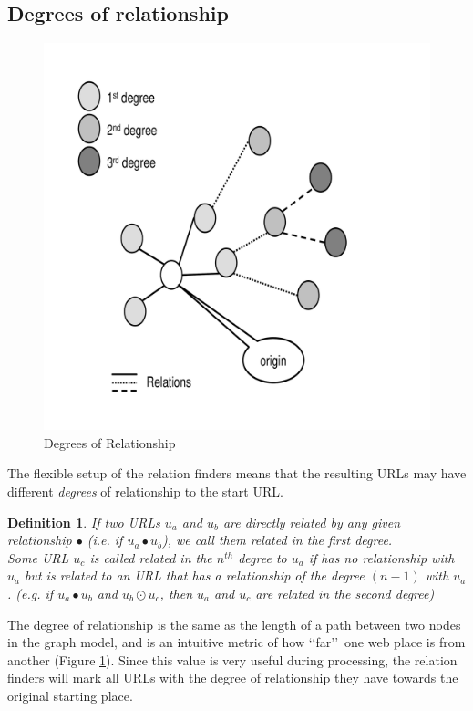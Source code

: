 \documentclass[a4paper,twoside]{danarticle}
\newtheorem{definition}{Definition}
\theoremstyle{remark}
\begin{document}
     \subsection{Degrees of relationship}
       \begin{figure}[ht]
       \centering
	 \includegraphics[width=12cm]{degrees}
	 \caption{Degrees of Relationship}
	 \label{degrees}
       \end{figure}
       The flexible setup of the relation finders means that the resulting 
       URLs may have different \textit{degrees} of relationship to the start 
       URL. 
       \begin{definition}
       If two URLs $ u_a $ and $ u_b $ are directly related by any given
       relationship $ \bullet $ (i.e. if $ u_a \bullet u_b $), 
       we call them related in the first degree.\\
       Some URL $ u_c $ is called related in the $ n^{th} $ degree to $ u_a $ if
       has no relationship with $ u_a $  but is related to an URL that 
       has a relationship of the degree $ (n-1) $ with $ u_a $. (e.g. if 
       $ u_a \bullet u_b$ and $ u_b \odot u_c $, then $ u_a $ and $ u_c $ are
       related in the second degree)
       \end{definition}
       The degree of relationship is the same as the length of a path between 
       two nodes in the graph model, and is an intuitive metric of how 
       \lq\lq far\rq\rq\ one web place is from another (Figure \ref{degrees}). 
       Since this value is very 
       useful during processing, the relation finders will mark all URLs with the 
       degree of relationship they have towards the original starting place.
\end{document}

